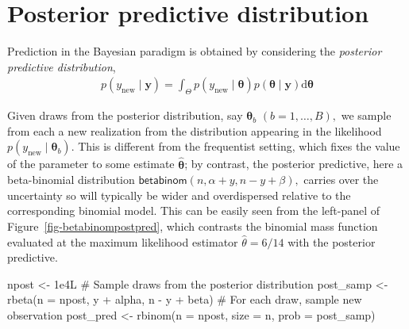 \documentclass[
  11pt,
  letterpaper,
]{scrbook}
\newenvironment{Shaded}{\begin{snugshade}}{\end{snugshade}}
\newcommand{\AttributeTok}[1]{\textcolor[rgb]{0.40,0.45,0.13}{#1}}
\newcommand{\CommentTok}[1]{\textcolor[rgb]{0.37,0.37,0.37}{#1}}
\newcommand{\FloatTok}[1]{\textcolor[rgb]{0.68,0.00,0.00}{#1}}
\newcommand{\FunctionTok}[1]{\textcolor[rgb]{0.28,0.35,0.67}{#1}}
\newcommand{\NormalTok}[1]{\textcolor[rgb]{0.00,0.23,0.31}{#1}}
\newcommand{\OtherTok}[1]{\textcolor[rgb]{0.00,0.23,0.31}{#1}}
\newcommand{\SpecialCharTok}[1]{\textcolor[rgb]{0.37,0.37,0.37}{#1}}
\theoremstyle{plain}
\theoremstyle{definition}
\theoremstyle{definition}
\theoremstyle{plain}
\theoremstyle{plain}
\theoremstyle{definition}
\theoremstyle{remark}
\begin{document}
\section{Posterior predictive
distribution}\label{posterior-predictive-distribution}

Prediction in the Bayesian paradigm is obtained by considering the
\emph{posterior predictive distribution}, \begin{align*}
p(y_{\text{new}} \mid \boldsymbol{y}) =
\int_{\Theta} p(y_{\text{new}}  \mid \boldsymbol{\theta}) p(\boldsymbol{\theta} \mid  \boldsymbol{y}) \mathrm{d} \boldsymbol{\theta}
\end{align*}

Given draws from the posterior distribution, say
\(\boldsymbol{\theta}_b\) \((b=1, \ldots, B),\) we sample from each a
new realization from the distribution appearing in the likelihood
\(p(y_{\text{new}}  \mid \boldsymbol{\theta}_b).\) This is different
from the frequentist setting, which fixes the value of the parameter to
some estimate \(\widehat{\boldsymbol{\theta}}\); by contrast, the
posterior predictive, here a beta-binomial distribution
\(\mathsf{beta binom}(n, \alpha + y, n - y + \beta),\) carries over the
uncertainty so will typically be wider and overdispersed relative to the
corresponding binomial model. This can be easily seen from the
left-panel of Figure~\ref{fig-betabinompostpred}, which contrasts the
binomial mass function evaluated at the maximum likelihood estimator
\(\widehat{\theta}=6/14\) with the posterior predictive.

\begin{Shaded}
\begin{Highlighting}[]
\NormalTok{npost }\OtherTok{\textless{}{-}} \FloatTok{1e4}\NormalTok{L}
\CommentTok{\# Sample draws from the posterior distribution}
\NormalTok{post\_samp }\OtherTok{\textless{}{-}} \FunctionTok{rbeta}\NormalTok{(}\AttributeTok{n =}\NormalTok{ npost, y }\SpecialCharTok{+}\NormalTok{ alpha, n }\SpecialCharTok{{-}}\NormalTok{ y }\SpecialCharTok{+}\NormalTok{ beta)}
\CommentTok{\# For each draw, sample new observation}
\NormalTok{post\_pred }\OtherTok{\textless{}{-}} \FunctionTok{rbinom}\NormalTok{(}\AttributeTok{n =}\NormalTok{ npost, }\AttributeTok{size =}\NormalTok{ n, }\AttributeTok{prob =}\NormalTok{ post\_samp)}
\end{Highlighting}
\end{Shaded}
\end{document}
